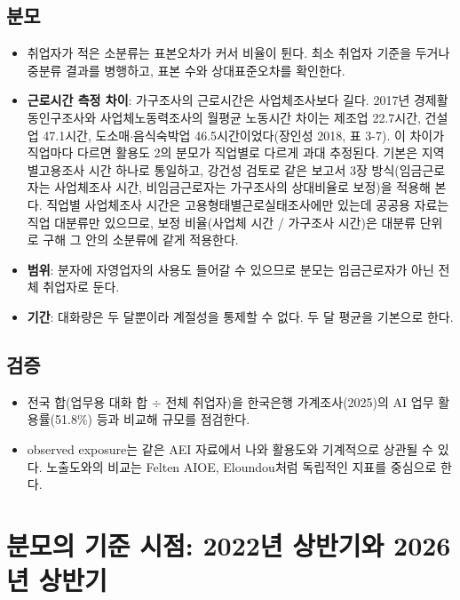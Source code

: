 \documentclass[11pt]{article}
\begin{document}
\subsection{분모}
\begin{itemize}[leftmargin=*]
  \item 취업자가 적은 소분류는 표본오차가 커서 비율이 튄다. 최소 취업자 기준을 두거나 중분류 결과를 병행하고, 표본 수와 상대표준오차를 확인한다.
  \item \textbf{근로시간 측정 차이}: 가구조사의 근로시간은 사업체조사보다 길다. 2017년 경제활동인구조사와 사업체노동력조사의 월평균 노동시간 차이는 제조업 22.7시간, 건설업 47.1시간, 도소매$\cdot$음식숙박업 46.5시간이었다(장인성 2018, 표 3-7). 이 차이가 직업마다 다르면 활용도 2의 분모가 직업별로 다르게 과대 추정된다. 기본은 지역별고용조사 시간 하나로 통일하고, 강건성 검토로 같은 보고서 3장 방식(임금근로자는 사업체조사 시간, 비임금근로자는 가구조사의 상대비율로 보정)을 적용해 본다. 직업별 사업체조사 시간은 고용형태별근로실태조사에만 있는데 공공용 자료는 직업 대분류만 있으므로, 보정 비율(사업체 시간 / 가구조사 시간)은 대분류 단위로 구해 그 안의 소분류에 같게 적용한다.
  \item \textbf{범위}: 분자에 자영업자의 사용도 들어갈 수 있으므로 분모는 임금근로자가 아닌 전체 취업자로 둔다.
  \item \textbf{기간}: 대화량은 두 달뿐이라 계절성을 통제할 수 없다. 두 달 평균을 기본으로 한다.
\end{itemize}

\subsection{검증}
\begin{itemize}[leftmargin=*]
  \item 전국 합(업무용 대화 합 $\div$ 전체 취업자)을 한국은행 가계조사(2025)의 AI 업무 활용률(51.8\%) 등과 비교해 규모를 점검한다.
  \item observed exposure는 같은 AEI 자료에서 나와 활용도와 기계적으로 상관될 수 있다. 노출도와의 비교는 Felten AIOE, Eloundou처럼 독립적인 지표를 중심으로 한다.
\end{itemize}

\section{분모의 기준 시점: 2022년 상반기와 2026년 상반기}\label{sec:base}
\end{document}
